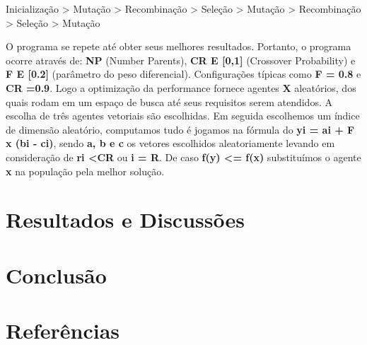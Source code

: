 \documentclass[a4paper, 12pt]{article}
\begin{document}
Inicialização > Mutação > Recombinação > Seleção > Mutação > Recombinação > Seleção > Mutação %

 O programa se repete até obter seus melhores resultados.
Portanto, o programa ocorre através de: \textbf{NP} (Number Parents), \textbf{CR E [0,1]} (Crossover Probability) e \textbf{F E [0.2]} (parâmetro do peso diferencial). Configurações típicas como \textbf{F = 0.8} e \textbf{CR =0.9}. Logo a optimização da performance fornece agentes \textbf{X} aleatórios, dos quais rodam em um espaço de busca até seus requisitos serem atendidos. A escolha de três agentes vetoriais são escolhidas. Em seguida escolhemos um índice de dimensão aleatório, computamos tudo é jogamos na fórmula do \textbf{yi = ai + F x (bi - ci)}, sendo \textbf{a, b e c} os vetores escolhidos aleatoriamente levando em consideração de \textbf{ri <CR} ou  \textbf{i = R}. De caso \textbf{f(y) <= f(x)} substituímos o agente \textbf{x} na população pela melhor solução.


\section{Resultados e Discussões}

\section{Conclusão}

\section{Referências}
\end{document}
